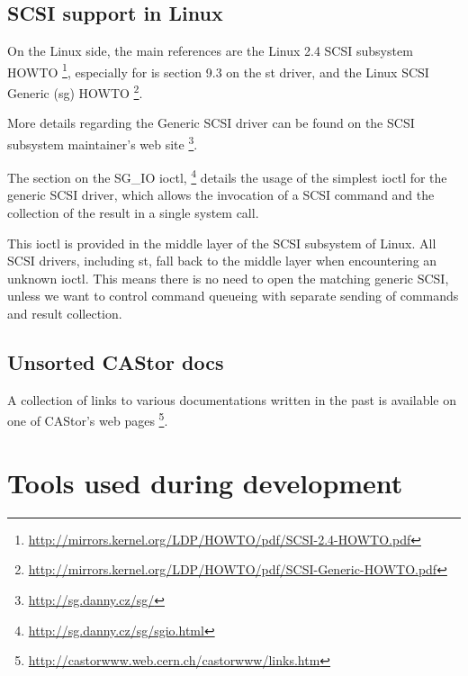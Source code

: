 \subsection{SCSI support in Linux}
On the Linux side, the main references are the Linux 2.4 SCSI subsystem HOWTO
       \footnote{ \href{http://mirrors.kernel.org/LDP/HOWTO/pdf/SCSI-2.4-HOWTO.pdf}
                       {http://mirrors.kernel.org/LDP/HOWTO/pdf/SCSI-2.4-HOWTO.pdf} },
especially for is section 9.3 on the st driver,
and the Linux SCSI Generic (sg) HOWTO 
       \footnote{ \href{http://mirrors.kernel.org/LDP/HOWTO/pdf/SCSI-Generic-HOWTO.pdf}
                       {http://mirrors.kernel.org/LDP/HOWTO/pdf/SCSI-Generic-HOWTO.pdf} }. 

More details regarding the Generic SCSI driver can be found on the SCSI subsystem maintainer's web site 
       \footnote{ \href{http://sg.danny.cz/sg/}{http://sg.danny.cz/sg/} }.

The section on the SG\_IO ioctl, \footnote{ \href{http://sg.danny.cz/sg/sg\textunderscore{}io.html}{http://sg.danny.cz/sg/sg\textunderscore{}io.html} } details the usage of the 
simplest ioctl for the generic SCSI driver, which allows the invocation of a SCSI command and the collection of the 
result in a single system call.

This ioctl is provided in the middle layer of the SCSI subsystem of Linux. All SCSI drivers, including st, fall back
to the middle layer when encountering an unknown ioctl. This means there is no need to open the matching generic SCSI,
unless we want to control command queueing with separate sending of commands and result collection.

\subsection{Unsorted CAStor docs}
A collection of links to various documentations written in the past is available on one of CAStor's web pages
       \footnote{ \href{http://castorwww.web.cern.ch/castorwww/links.htm}{http://castorwww.web.cern.ch/castorwww/links.htm} }.

\section{Tools used during development}
